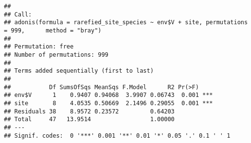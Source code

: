\documentclass[
]{article}
\newenvironment{Shaded}{\begin{snugshade}}{\end{snugshade}}
\newcommand{\AttributeTok}[1]{\textcolor[rgb]{0.77,0.63,0.00}{#1}}
\newcommand{\ConstantTok}[1]{\textcolor[rgb]{0.00,0.00,0.00}{#1}}
\newcommand{\DecValTok}[1]{\textcolor[rgb]{0.00,0.00,0.81}{#1}}
\newcommand{\FunctionTok}[1]{\textcolor[rgb]{0.00,0.00,0.00}{#1}}
\newcommand{\NormalTok}[1]{#1}
\newcommand{\OtherTok}[1]{\textcolor[rgb]{0.56,0.35,0.01}{#1}}
\newcommand{\SpecialCharTok}[1]{\textcolor[rgb]{0.00,0.00,0.00}{#1}}
\newcommand{\StringTok}[1]{\textcolor[rgb]{0.31,0.60,0.02}{#1}}
\begin{document}
\begin{Shaded}
\end{Shaded}

\begin{verbatim}
## 
## Call:
## adonis(formula = rarefied_site_species ~ env$V + site, permutations = 999,      method = "bray") 
## 
## Permutation: free
## Number of permutations: 999
## 
## Terms added sequentially (first to last)
## 
##           Df SumsOfSqs MeanSqs F.Model      R2 Pr(>F)    
## env$V      1    0.9407 0.94068  3.9907 0.06743  0.001 ***
## site       8    4.0535 0.50669  2.1496 0.29055  0.001 ***
## Residuals 38    8.9572 0.23572         0.64203           
## Total     47   13.9514                 1.00000           
## ---
## Signif. codes:  0 '***' 0.001 '**' 0.01 '*' 0.05 '.' 0.1 ' ' 1
\end{verbatim}
\end{document}
